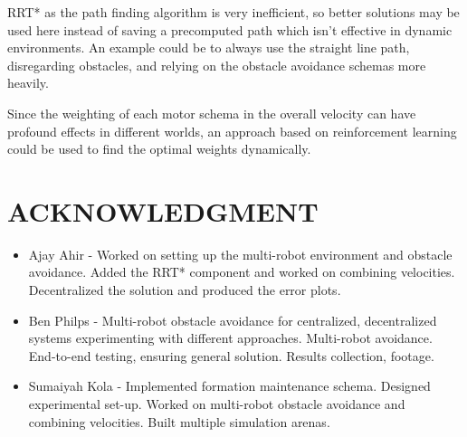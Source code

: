 \documentclass[letterpaper, 10 pt, conference]{ieeeconf}  %
\begin{document}
RRT* as the path finding algorithm is very inefficient, so better solutions may be used here instead of saving a precomputed path which isn't effective in dynamic environments. An example could be to always use the straight line path, disregarding obstacles, and relying on the obstacle avoidance schemas more heavily.

Since the weighting of each motor schema in the overall velocity can have profound effects in different worlds, an approach based on reinforcement learning could be used to find the optimal weights dynamically.

\addtolength{\textheight}{-12cm}   %

\section{ACKNOWLEDGMENT}

\begin{itemize}
\item Ajay Ahir - Worked on setting up the multi-robot environment and obstacle avoidance. Added the RRT* component and worked on combining velocities. Decentralized the solution and produced the error plots.

\item Ben Philps - Multi-robot obstacle avoidance for centralized, decentralized systems experimenting with different approaches. Multi-robot avoidance. End-to-end testing, ensuring general solution. Results collection, footage.

\item Sumaiyah Kola - Implemented formation maintenance schema. Designed experimental set-up. Worked on multi-robot obstacle avoidance and combining velocities. Built multiple simulation arenas. 
\end{itemize}
\end{document}
